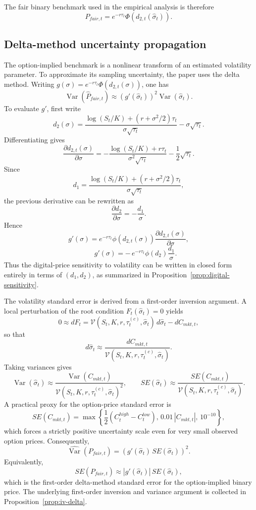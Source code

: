 \documentclass[11pt]{article}
\numberwithin{equation}{section}
\theoremstyle{plain}
\begin{document}
The fair binary benchmark used in the empirical analysis is therefore
\[
P_{fair,t}
=
e^{-r\tau_t}\Phi\!\left(d_{2,t}(\hat{\sigma}_t)\right).
\]

\subsection{Delta-method uncertainty propagation}
The option-implied benchmark is a nonlinear transform of an estimated volatility parameter. To approximate its sampling uncertainty, the paper uses the delta method. Writing $g(\sigma)=e^{-r\tau_t}\Phi(d_{2,t}(\sigma))$, one has
\[
\operatorname{Var}(\widehat{P}_{fair,t})
\approx
\left(g'(\hat{\sigma}_t)\right)^2\operatorname{Var}(\hat{\sigma}_t).
\]
To evaluate $g'$, first write
\[
d_2(\sigma)
=
\frac{\log(S_t/K)+(r+\sigma^2/2)\tau_t}{\sigma\sqrt{\tau_t}}
-\sigma\sqrt{\tau_t}.
\]
Differentiating gives
\[
\frac{\partial d_{2,t}(\sigma)}{\partial \sigma}
=
-\frac{\log(S_t/K)+r\tau_t}{\sigma^2\sqrt{\tau_t}}
-\frac{1}{2}\sqrt{\tau_t}.
\]
Since
\[
d_1
=
\frac{\log(S_t/K)+(r+\sigma^2/2)\tau_t}{\sigma\sqrt{\tau_t}},
\]
the previous derivative can be rewritten as
\[
\frac{\partial d_2}{\partial \sigma}=-\frac{d_1}{\sigma}.
\]
Hence
\[
g'(\sigma)=e^{-r\tau_t}\phi(d_{2,t}(\sigma))\frac{\partial d_{2,t}(\sigma)}{\partial \sigma},
\]
\[
\qquad
g'(\sigma)
=
-\,e^{-r\tau_t}\phi(d_2)\frac{d_1}{\sigma}.
\]
Thus the digital-price sensitivity to volatility can be written in closed form entirely in terms of $(d_1,d_2)$, as summarized in Proposition~\ref{prop:digital-sensitivity}.

The volatility standard error is derived from a first-order inversion argument. A local perturbation of the root condition $F_t(\hat{\sigma}_t)=0$ yields
\[
0
\approx
dF_t
=
\mathcal{V}(S_t,K,r,\tau_t^{(c)},\hat{\sigma}_t)\,d\hat{\sigma}_t
-dC_{mkt,t},
\]
so that
\[
d\hat{\sigma}_t
\approx
\frac{dC_{mkt,t}}
{\mathcal{V}(S_t,K,r,\tau_t^{(c)},\hat{\sigma}_t)}.
\]
Taking variances gives
\[
\operatorname{Var}(\hat{\sigma}_t)
\approx
\frac{\operatorname{Var}(C_{mkt,t})}
{\mathcal{V}(S_t,K,r,\tau_t^{(c)},\hat{\sigma}_t)^2},
\qquad
SE(\hat{\sigma}_t)
\approx
\frac{SE(C_{mkt,t})}
{\mathcal{V}(S_t,K,r,\tau_t^{(c)},\hat{\sigma}_t)}.
\]
A practical proxy for the option-price standard error is
\[
SE(C_{mkt,t})
=
\max\!\left\{\frac{1}{2}(C^{high}_t-C^{low}_t),\,0.01\,|C_{mkt,t}|,\,10^{-10}\right\},
\]
which forces a strictly positive uncertainty scale even for very small observed option prices. Consequently,
\[
\widehat{\operatorname{Var}}(P_{fair,t})
=
\left(g'(\hat{\sigma}_t)\,SE(\hat{\sigma}_t)\right)^2.
\]
Equivalently,
\[
SE(P_{fair,t})
\approx
\left|g'(\hat{\sigma}_t)\right|\,SE(\hat{\sigma}_t),
\]
which is the first-order delta-method standard error for the option-implied binary price. The underlying first-order inversion and variance argument is collected in Proposition~\ref{prop:iv-delta}.
\end{document}
